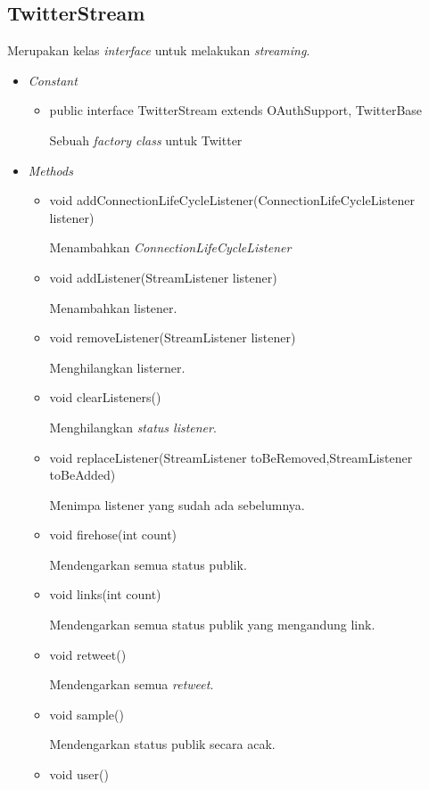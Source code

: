 	\subsection{TwitterStream}
	Merupakan kelas \textit{interface} untuk melakukan \textit{streaming}.
	\begin{itemize}
		\item \textit{Constant}
		
		\begin{itemize}
			\item public interface TwitterStream
			extends OAuthSupport, TwitterBase
			
			Sebuah \textit{factory class} untuk Twitter
		\end{itemize}
		
		\item \textit{Methods}
		
		\begin{itemize}
			\item void addConnectionLifeCycleListener(ConnectionLifeCycleListener listener)
			
			Menambahkan \textit{ConnectionLifeCycleListener}
			\item void addListener(StreamListener listener)
			
			Menambahkan listener.
			\item void removeListener(StreamListener listener)
			
			Menghilangkan listerner.
			\item void clearListeners()
			
			Menghilangkan \textit{status listener}.
			\item void replaceListener(StreamListener toBeRemoved,StreamListener toBeAdded)
			
			Menimpa listener yang sudah ada sebelumnya.
			\item void firehose(int count)
			
			Mendengarkan semua status publik.
			\item void links(int count)
			
			Mendengarkan semua status publik yang mengandung link.
			\item void retweet()
			
			Mendengarkan semua \textit{retweet}.
			\item void sample()
			
			Mendengarkan status publik secara acak.
			\item void user()
			

\end{itemize}
\end{itemize}
